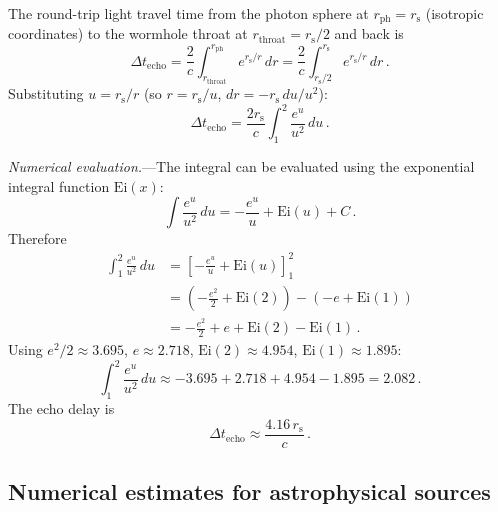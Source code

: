 \documentclass[aps,prd,preprint,superscriptaddress,longbibliography]{revtex4-2}
\newcommand{\rs}{r_{\mathrm{s}}}
\begin{document}
The round-trip light travel time from the photon sphere at
$r_{\mathrm{ph}} = \rs$ (isotropic coordinates) to the wormhole
throat at $r_{\mathrm{throat}} = \rs/2$ and back is
\begin{equation}
  \Delta t_{\mathrm{echo}} = \frac{2}{c}\int_{r_{\mathrm{throat}}}^{r_{\mathrm{ph}}}
  e^{\rs/r}\,dr
  = \frac{2}{c}\int_{\rs/2}^{\rs} e^{\rs/r}\,dr\,.
  \label{eq:echo_integral}
\end{equation}
Substituting $u = \rs/r$ (so $r = \rs/u$, $dr = -\rs\,du/u^2$):
\begin{equation}
  \Delta t_{\mathrm{echo}} = \frac{2\rs}{c}\int_{1}^{2}
  \frac{e^u}{u^2}\,du\,.
  \label{eq:echo_u}
\end{equation}

\emph{Numerical evaluation.}---The integral can be evaluated using
the exponential integral function $\mathrm{Ei}(x)$:
\begin{equation}
  \int \frac{e^u}{u^2}\,du = -\frac{e^u}{u} + \mathrm{Ei}(u) + C\,.
  \label{eq:Ei}
\end{equation}
Therefore
\begin{align}
  \int_1^2 \frac{e^u}{u^2}\,du
  &= \left[-\frac{e^u}{u} + \mathrm{Ei}(u)\right]_1^2
  \nonumber\\
  &= \left(-\frac{e^2}{2} + \mathrm{Ei}(2)\right)
  - \left(-e + \mathrm{Ei}(1)\right)
  \nonumber\\
  &= -\frac{e^2}{2} + e + \mathrm{Ei}(2) - \mathrm{Ei}(1)\,.
  \label{eq:echo_exact}
\end{align}
Using $e^2/2 \approx 3.695$, $e \approx 2.718$,
$\mathrm{Ei}(2) \approx 4.954$, $\mathrm{Ei}(1) \approx 1.895$:
\begin{equation}
  \int_1^2 \frac{e^u}{u^2}\,du \approx -3.695 + 2.718 + 4.954 - 1.895
  = 2.082\,.
  \label{eq:echo_numerical}
\end{equation}
The echo delay is
\begin{equation}
  \boxed{\Delta t_{\mathrm{echo}} \approx \frac{4.16\,\rs}{c}\,.}
  \label{eq:echo_result}
\end{equation}

\subsection{Numerical estimates for astrophysical sources}
\end{document}
